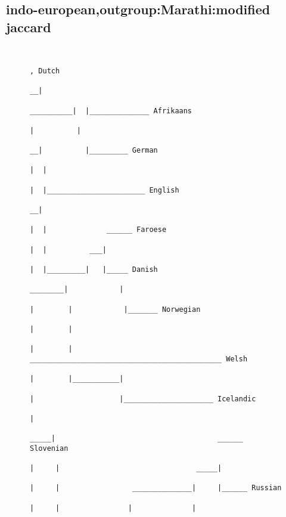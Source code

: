 \subsection{indo-european,outgroup:Marathi:modified jaccard}
\begin{figure}[H]
\begin{center}
{
\selectfont
\begin{verbatim}

                                                                                              , Dutch
                                                                                            __|
                                                                                 __________|  |______________ Afrikaans
                                                                                |          |
                                                                              __|          |_________ German
                                                                             |  |
                                                                             |  |_______________________ English
                                                                           __|
                                                                          |  |              ______ Faroese
                                                                          |  |          ___|
                                                                          |  |_________|   |_____ Danish
                                                                  ________|            |
                                                                 |        |            |_______ Norwegian
                                                                 |        |
                                                                 |        |            _____________________________________________ Welsh
                                                                 |        |___________|
                                                                 |                    |_____________________ Icelandic
                                                                 |
                                                            _____|                                      ______ Slovenian
                                                           |     |                                _____|
                                                           |     |                 ______________|     |______ Russian
                                                           |     |                |              |

\end{verbatim}}
\end{center}
\end{figure}
